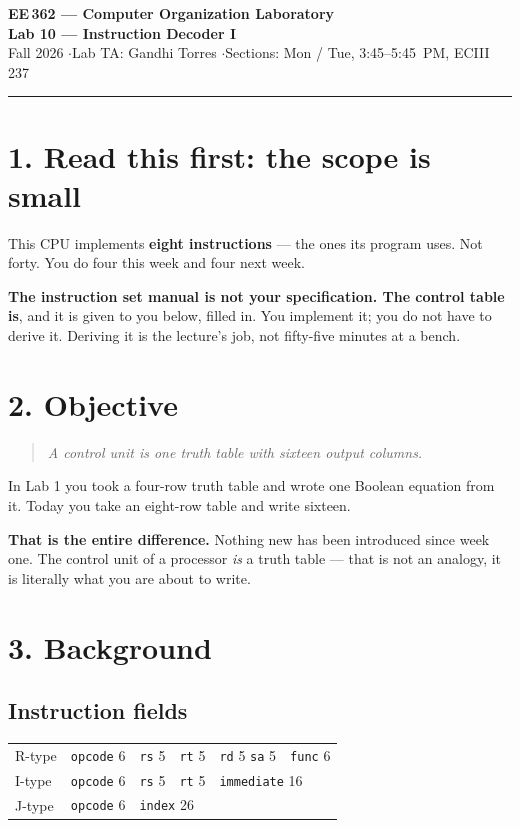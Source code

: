 \documentclass[11pt]{article}
\newcommand{\code}[1]{\texttt{#1}}
\newcommand{\hr}{\vspace{2pt}\hrule\vspace{6pt}}
\begin{document}
\begin{center}
{\Large\bfseries EE\,362 --- Computer Organization Laboratory}\\[2pt]
{\large\bfseries Lab 10 --- Instruction Decoder I}\\[4pt]
Fall 2026 \quad$\cdot$\quad Lab TA: Gandhi Torres \quad$\cdot$\quad Sections: Mon / Tue, 3:45--5:45~PM, ECIII 237
\end{center}
\hr

\section*{1. Read this first: the scope is small}

This CPU implements \textbf{eight instructions} --- the ones its program uses.
Not forty. You do four this week and four next week.

\textbf{The instruction set manual is not your specification. The control table
is}, and it is given to you below, filled in. You implement it; you do not have
to derive it. Deriving it is the lecture's job, not fifty-five minutes at a
bench.

\section*{2. Objective}

\begin{quote}
\emph{A control unit is one truth table with sixteen output columns.}
\end{quote}

In Lab 1 you took a four-row truth table and wrote one Boolean equation from it.
Today you take an eight-row table and write sixteen.

\textbf{That is the entire difference.} Nothing new has been introduced since
week one. The control unit of a processor \emph{is} a truth table --- that is
not an analogy, it is literally what you are about to write.

\section*{3. Background}

\subsection*{Instruction fields}

\begin{center}
\begin{tabular}{llllll}
\toprule
R-type & \code{opcode} 6 & \code{rs} 5 & \code{rt} 5 & \code{rd} 5 \quad \code{sa} 5 & \code{func} 6 \\
I-type & \code{opcode} 6 & \code{rs} 5 & \code{rt} 5 & \multicolumn{2}{l}{\code{immediate} 16} \\
J-type & \code{opcode} 6 & \multicolumn{4}{l}{\code{index} 26} \\
\bottomrule
\end{tabular}
\end{center}
\end{document}
